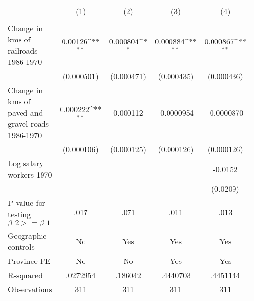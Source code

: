 {
\def\sym#1{\ifmmode^{#1}\else\(^{#1}\)\fi}
\begin{tabular}{l*{4}{c}}
\hline\hline
                &\multicolumn{1}{c}{(1)}&\multicolumn{1}{c}{(2)}&\multicolumn{1}{c}{(3)}&\multicolumn{1}{c}{(4)}\\
                &\multicolumn{1}{c}{}&\multicolumn{1}{c}{}&\multicolumn{1}{c}{}&\multicolumn{1}{c}{}\\
\hline
Change in kms of railroads 1986-1970&  0.00126\sym{**} & 0.000804\sym{*}  & 0.000884\sym{**} & 0.000867\sym{**} \\
                &(0.000501)         &(0.000471)         &(0.000435)         &(0.000436)         \\
[1em]
Change in kms of paved and gravel roads 1986-1970& 0.000222\sym{**} & 0.000112         &-0.0000954         &-0.0000870         \\
                &(0.000106)         &(0.000125)         &(0.000126)         &(0.000126)         \\
[1em]
Log salary workers 1970&                  &                  &                  &  -0.0152         \\
                &                  &                  &                  & (0.0209)         \\
\hline
P-value for testing $\beta\_{2} >= \beta\_{1}$&     .017         &     .071         &     .011         &     .013         \\
Geographic controls&       No         &      Yes         &      Yes         &      Yes         \\
Province FE     &       No         &       No         &      Yes         &      Yes         \\
R-squared       & .0272954         &  .186042         & .4440703         & .4451144         \\
Observations    &      311         &      311         &      311         &      311         \\
\hline\hline
\end{tabular}
}

